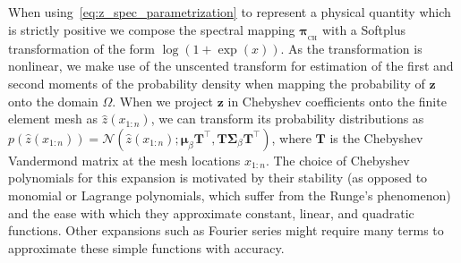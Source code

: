 \documentclass[11pt, fleqn]{article}
\def\z{{\mathbf z}}
\def\NPDF{{\mathcal N}}
\def\bpi{{\boldsymbol \pi}}
\def\bpi{{\boldsymbol \pi}}
\def \bpiCH{{\bpi_{_\text{CH}}}}
\def \bmu {{\boldsymbol \mu}}
\begin{document}
When using~\eqref{eq:z_spec_parametrization} to represent a physical quantity which is strictly positive we compose the spectral mapping $\bpiCH$ with a Softplus transformation of the form $\log(1+\exp(x))$. As the transformation is nonlinear, we make use of the unscented transform \cite{wan2000unscented} for estimation of the first and second moments of the probability density when mapping the probability of $\z$ onto the domain $\Omega$. When we project $\z$ in Chebyshev coefficients onto the finite element mesh as $\hat{z}(x_{1:n})$, we can transform its probability distributions as $p(\hat{z}(x_{1:n})) = \NPDF(\hat{z}(x_{1:n}); \bmu_\beta \mathbf{T}^\top, \mathbf{T} \mathbf{\Sigma}_\beta \mathbf{T}^\top)$, where $\mathbf{T}$ is the Chebyshev Vandermond matrix at the mesh locations $x_{1:n}$. The choice of Chebyshev polynomials for this expansion is motivated by their stability (as opposed to monomial or Lagrange polynomials, which suffer from the Runge's phenomenon) and the ease with which they approximate constant, linear, and quadratic functions. Other expansions such as Fourier series might require many terms to approximate these simple functions with accuracy.


\end{document}
